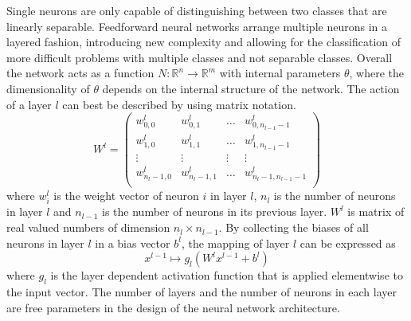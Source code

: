 %
Single neurons are only capable of distinguishing between two classes that are linearly separable. Feedforward neural networks arrange multiple neurons in a layered fashion, introducing new complexity and allowing for the classification of more difficult problems with multiple classes and not separable classes. Overall the network acts as a function $N: \mathbb{R}^n \rightarrow \mathbb{R}^m$ with internal parameters $\theta$, where the dimensionality of $\theta$ depends on the internal structure of the network. The action of a layer $l$ can best be described by using matrix notation. 
\begin{equation}
W^l = 
\begin{pmatrix}
w_{0,0}^l & w_{0,1}^l & \dots & w_{0,n_{l-1}-1}^l \\
w_{1,0}^l & w_{1,1}^l & \dots & w_{1,n_{l-1}-1}^l \\
\vdots & \vdots & \vdots & \vdots \\
w_{n_l-1,0}^l & w_{n_l-1,1}^l & \dots & w_{n_l-1,n_{l-1}-1}^l \\
\end{pmatrix}
\end{equation}
where $w_i^l$ is the weight vector of neuron $i$ in layer $l$, $n_l$ is the number of neurons in layer $l$ and $n_{l-1}$ is the number of neurons in its previous layer. $W^l$ is matrix of real valued numbers of dimension $n_l \times n_{l-1}$. By collecting the biases of all neurons in layer $l$ in a bias vector $b^l$, the mapping of layer $l$ can be expressed as%
\begin{equation}
x^{l-1} \mapsto g_l(W^l x^{l-1} + b^l)
\end{equation}
where $g_l$ is the layer dependent activation function that is applied elementwise to the input vector. The number of layers and the number of neurons in each layer are free parameters in the design of the neural network architecture. \\


